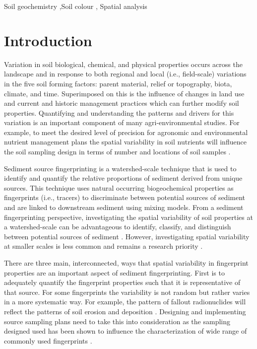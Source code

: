 \documentclass[
  number]{elsarticle}
\begin{document}
\begin{frontmatter}
\begin{keyword}
    Soil geochemistry \sep Soil colour \sep 
    Spatial analysis
\end{keyword}
\end{frontmatter}
    

\section{Introduction}\label{introduction}

Variation in soil biological, chemical, and physical properties occurs
across the landscape and in response to both regional and local (i.e.,
field-scale) variations in the five soil forming factors: parent
material, relief or topography, biota, climate, and time. Superimposed
on this is the influence of changes in land use and current and historic
management practices which can further modify soil properties.
Quantifying and understanding the patterns and drivers for this
variation is an important component of many agri-environmental studies.
For example, to meet the desired level of precision for agronomic and
environmental nutrient management plans the spatial variability in soil
nutrients will influence the soil sampling design in terms of number and
locations of soil samples \citep{starr1995, kariuki2009}.

Sediment source fingerprinting is a watershed-scale technique that is
used to identify and quantify the relative proportions of sediment
derived from unique sources. This technique uses natural occurring
biogeochemical properties as fingerprints (i.e., tracers) to
discriminate between potential sources of sediment and are linked to
downstream sediment using mixing models. From a sediment fingerprinting
perspective, investigating the spatial variability of soil properties at
a watershed-scale can be advantageous to identify, classify, and
distinguish between potential sources of sediment \citep{pulley2017}.
However, investigating spatial variability at smaller scales is less
common \citep[e.g.,][]{du2017, pulley2018, collins2019, lunamiño2024}
and remains a research priority \citep{collins2020}.

There are three main, interconnected, ways that spatial variability in
fingerprint properties are an important aspect of sediment
fingerprinting. First is to adequately quantify the fingerprint
properties such that it is representative of that source. For some
fingerprints the variability is not random but rather varies in a more
systematic way. For example, the pattern of fallout radionuclides will
reflect the patterns of soil erosion and deposition
\citep{wilkinson2015}. Designing and implementing source sampling plans
need to take this into consideration as the sampling designed used has
been shown to influence the characterization of wide range of commonly
used fingerprints \citep{lunamiño2024}.
\end{document}
